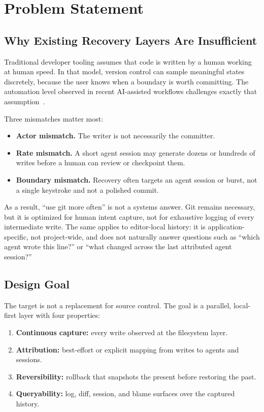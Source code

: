\documentclass[10pt,a4paper]{article}
\begin{document}
\section{Problem Statement}

\subsection{Why Existing Recovery Layers Are Insufficient}

Traditional developer tooling assumes that code is written by a human working at
human speed. In that model, version control can sample meaningful states
discretely, because the user knows when a boundary is worth committing. The
automation level observed in recent AI-assisted workflows challenges exactly
that assumption~\cite{chen2025codewithme,agarwal2026aiides}.

Three mismatches matter most:

\begin{itemize}
  \item \textbf{Actor mismatch.} The writer is not necessarily the committer.
  \item \textbf{Rate mismatch.} A short agent session may generate dozens or hundreds of writes before a human can review or checkpoint them.
  \item \textbf{Boundary mismatch.} Recovery often targets an agent session or burst, not a single keystroke and not a polished commit.
\end{itemize}

As a result, ``use git more often'' is not a systems answer. Git remains
necessary, but it is optimized for human intent capture, not for exhaustive
logging of every intermediate write. The same applies to editor-local history:
it is application-specific, not project-wide, and does not naturally answer
questions such as ``which agent wrote this line?'' or ``what changed across the
last attributed agent session?''

\subsection{Design Goal}

The target is not a replacement for source control. The goal is a parallel,
local-first layer with four properties:

\begin{enumerate}
  \item \textbf{Continuous capture:} every write observed at the filesystem layer.
  \item \textbf{Attribution:} best-effort or explicit mapping from writes to agents and sessions.
  \item \textbf{Reversibility:} rollback that snapshots the present before restoring the past.
  \item \textbf{Queryability:} log, diff, session, and blame surfaces over the captured history.
\end{enumerate}
\end{document}
